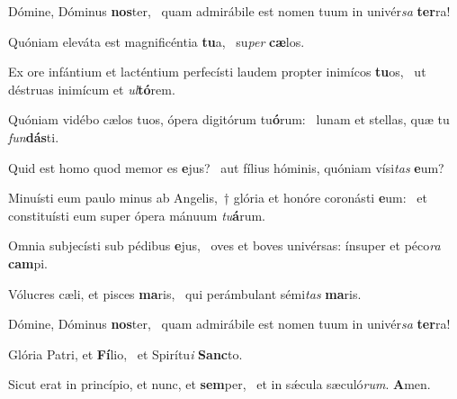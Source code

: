 \item Dómine, Dóminus \textbf{nos}ter,~\psstar{} quam admirábile est nomen tuum in univér\textit{sa} \textbf{ter}ra!
\item Quóniam eleváta est magnificéntia \textbf{tu}a,~\psstar{} su\textit{per} \textbf{cæ}los.
\item Ex ore infántium et lacténtium perfecísti laudem propter inimícos \textbf{tu}os,~\psstar{} ut déstruas inimícum et \textit{ul}\textbf{tó}rem.
\item Quóniam vidébo cælos tuos, ópera digitórum tu\textbf{ó}rum:~\psstar{} lunam et stellas, quæ tu \textit{fun}\textbf{dás}ti.
\item Quid est homo quod memor es \textbf{e}jus?~\psstar{} aut fílius hóminis, quóniam vísi\textit{tas} \textbf{e}um?
\item Minuísti eum paulo minus ab Angelis,~† glória et honóre coronásti \textbf{e}um:~\psstar{} et constituísti eum super ópera mánuum \textit{tu}\textbf{á}rum.
\item Omnia subjecísti sub pédibus \textbf{e}jus,~\psstar{} oves et boves univérsas: ínsuper et péco\textit{ra} \textbf{cam}pi.
\item Vólucres cæli, et pisces \textbf{ma}ris,~\psstar{} qui perámbulant sémi\textit{tas} \textbf{ma}ris.
\item Dómine, Dóminus \textbf{nos}ter,~\psstar{} quam admirábile est nomen tuum in univér\textit{sa} \textbf{ter}ra!
\item Glória Patri, et \textbf{Fí}lio,~\psstar{} et Spirítu\textit{i} \textbf{Sanc}to.
\item Sicut erat in princípio, et nunc, et \textbf{sem}per,~\psstar{} et in sǽcula sæculó\textit{rum}. \textbf{A}men.
